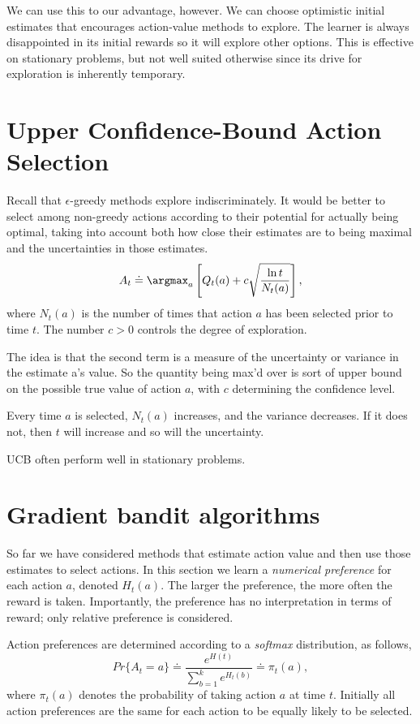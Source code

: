 {We can use this to our advantage, however. We can choose optimistic initial estimates that encourages action-value methods to explore. The learner is always disappointed in its initial rewards so it will explore other options. This is effective on stationary problems, but not well suited otherwise since its drive for exploration is inherently temporary.

\section
{Upper Confidence-Bound Action Selection}
Recall that $\epsilon$-greedy methods explore indiscriminately. It would be better to select among non-greedy actions according to their potential for actually being optimal, taking into account both how close their estimates are to being maximal and the uncertainties in those estimates.
\begin{equation}
\label{e.ucb}
A_t \doteq \argmax_{a} \left[ Q_t(a) + c \sqrt{\frac{\ln t}{N_t(a)}} \right]
,\end{equation}
where $N_t(a)$ is the number of times that action $a$ has been selected prior to time $t$. The number $c>0$ controls the degree of exploration.

The idea is that the second term is a measure of the uncertainty or variance in the estimate a's value. So the quantity being max'd over is sort of upper bound on the possible true value of action $a$, with $c$ determining the confidence level. 

Every time $a$ is selected, $N_t(a)$ increases, and the variance decreases. If it does not, then  $t$ will increase and so will the uncertainty.

UCB often perform well in stationary problems.

\section{Gradient bandit algorithms}
So far we have considered methods that estimate action value and then use those estimates to select actions. In this section we learn a \textit{numerical preference} for each action $a$, denoted $H_t(a)$. The larger the preference, the more often the reward is taken. Importantly, the preference has no interpretation in terms of reward; only relative preference is considered.

Action preferences are determined according to a \textit{softmax} distribution, as follows, 
\begin{equation}
\label{e.soft}
Pr \{A_t=a\} \doteq \frac{e^{H(t)}}{\sum_{b=1}^{k} e^{H_t(b)}} \doteq \pi_t (a)
,\end{equation}
where $\pi_t(a)$ denotes the probability of taking action $a$ at time $t$. Initially all action preferences are the same for each action to be equally likely to be selected.

}
